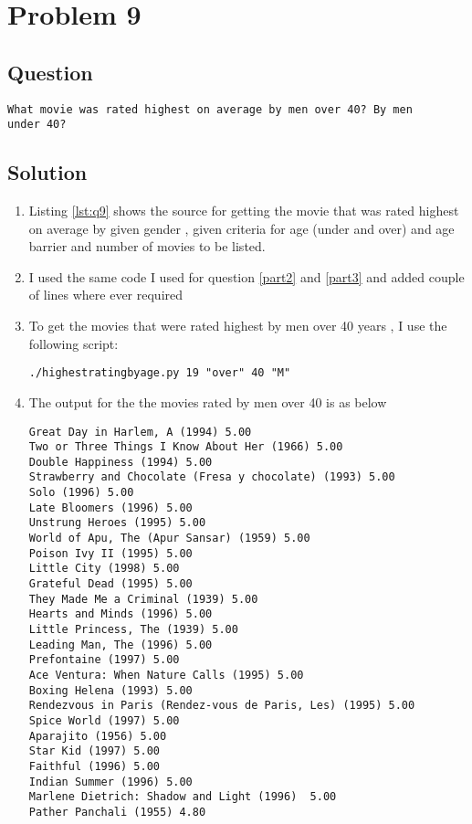\section{Problem 9}
\label{part9}
\subsection*{Question}
\begingroup
\begin{verbatim}
What movie was rated highest on average by men over 40? By men
under 40?
\end{verbatim}
\subsection{Solution}
\begin{enumerate}
\item Listing \ref{lst:q9} shows the source for getting the movie that was rated highest on average by given gender , given criteria for age (under and over) and age barrier and number of movies to be listed.
\item I used the same code I used for question \ref{part2} and \ref{part3} and added couple of lines where ever required 
\item To get the movies that were rated highest by men over 40 years , I use the following script:
\begin{lstlisting}[frame=single]
 ./highestratingbyage.py 19 "over" 40 "M"
\end{lstlisting}
\item The output for the the movies rated by men over 40 is as below
\begin{lstlisting}[frame=single]
Great Day in Harlem, A (1994) 5.00
Two or Three Things I Know About Her (1966) 5.00
Double Happiness (1994) 5.00
Strawberry and Chocolate (Fresa y chocolate) (1993) 5.00
Solo (1996) 5.00
Late Bloomers (1996) 5.00
Unstrung Heroes (1995) 5.00
World of Apu, The (Apur Sansar) (1959) 5.00
Poison Ivy II (1995) 5.00
Little City (1998) 5.00
Grateful Dead (1995) 5.00
They Made Me a Criminal (1939) 5.00
Hearts and Minds (1996) 5.00
Little Princess, The (1939) 5.00
Leading Man, The (1996) 5.00
Prefontaine (1997) 5.00
Ace Ventura: When Nature Calls (1995) 5.00
Boxing Helena (1993) 5.00
Rendezvous in Paris (Rendez-vous de Paris, Les) (1995) 5.00
Spice World (1997) 5.00
Aparajito (1956) 5.00
Star Kid (1997) 5.00
Faithful (1996) 5.00
Indian Summer (1996) 5.00
Marlene Dietrich: Shadow and Light (1996)  5.00
Pather Panchali (1955) 4.80


\end{lstlisting}
\end{enumerate}
